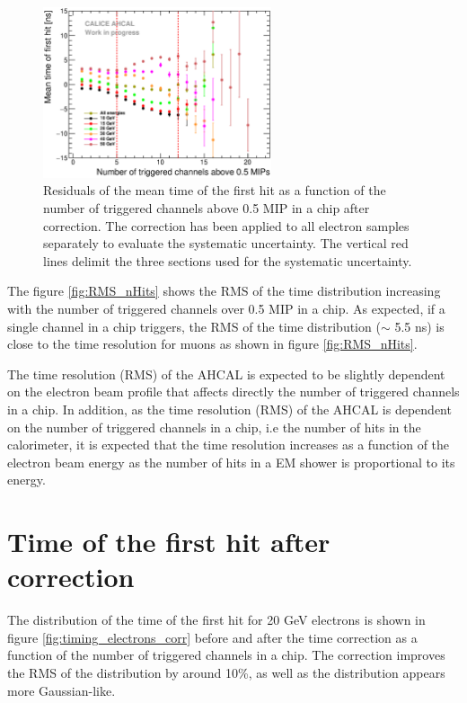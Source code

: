 \begin{figure}[htbp!]
	\centering
	\includegraphics[width=0.6\textwidth]{../Thesis_Plots/Timing/Electrons/Plots/CheckCorrection.eps}
	\caption{Residuals of the mean time of the first hit as a function of the number of triggered channels above 0.5 MIP in a chip after correction. The correction has been applied to all electron samples separately to evaluate the systematic uncertainty. The vertical red lines delimit the three sections used for the systematic uncertainty.}
	\label{fig:Nhit_residuals}
\end{figure}

The figure \ref{fig:RMS_nHits} shows the RMS of the time distribution increasing with the number of triggered channels over 0.5 MIP in a chip. As expected, if a single channel in a chip triggers, the RMS of the time distribution ($\sim$ 5.5 ns) is close to the time resolution for muons as shown in figure \ref{fig:RMS_nHits}.

The time resolution (RMS) of the AHCAL is expected to be slightly dependent on the electron beam profile that affects directly the number of triggered channels in a chip. In addition, as the time resolution (RMS) of the AHCAL is dependent on the number of triggered channels in a chip, i.e the number of hits in the calorimeter, it is expected that the time resolution increases as a function of the electron beam energy as the number of hits in a EM shower is proportional to its energy.

\section{Time of the first hit after correction}
\label{subsec:Electron_Final}

The distribution of the time of the first hit for 20 GeV electrons is shown in figure \ref{fig:timing_electrons_corr} before and after the time correction as a function of the number of triggered channels in a chip. The correction improves the RMS of the distribution by around 10\%, as well as the distribution appears more Gaussian-like.


